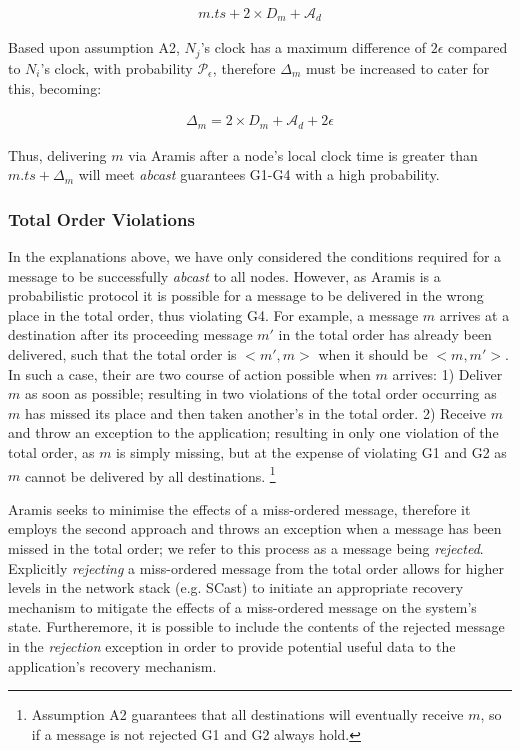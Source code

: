 		\begin{equation*}
		    \begin{aligned}
		        m.ts + 2\times{D_m} + \mathcal{A}_d
		    \end{aligned}
		\end{equation*}
		 
		 Based upon assumption A2, $N_j$'s clock has a maximum difference of $2\epsilon$ compared to $N_i$'s clock, with  probability $\mathcal{P}_\epsilon$, therefore $\Delta_m$ must be increased to cater for this, becoming:
		
        \begin{equation*}
		    \begin{aligned}
		        \Delta_m = 2 \times D_m + \mathcal{A}_d + 2\epsilon
		    \end{aligned}
		\end{equation*}		
		
		Thus, delivering $m$ via \textsf{Aramis} after a node's local clock time is greater than $m.ts + \Delta_m$ will meet \emph{abcast} guarantees G1-G4 with a high probability.
			    
		\subsubsection*{Total Order Violations}\label{ssec:abcast_rejection}
		In the explanations above, we have only considered the conditions required for a message to be successfully \emph{abcast} to all nodes.  However, as \textsf{Aramis} is a probabilistic protocol it is possible for a message to be delivered in the wrong place in the total order, thus violating G4.  For example, a message $m$ arrives at a destination after its proceeding message $m'$ in the total order has already been delivered, such that the total order is $<m', m>$ when it should be $<m, m'>$.  In such a case, their are two course of action possible when $m$ arrives: 1) Deliver $m$ as soon as possible; resulting in two violations of the total order occurring as $m$ has missed its place and then taken another's in the total order.  2) Receive $m$ and throw an exception to the application; resulting in only one violation of the total order, as $m$ is simply missing, but at the expense of violating G1 and G2 as $m$ cannot be delivered by all destinations.  \footnote{Assumption A2 guarantees that all destinations will eventually receive $m$, so if a message is not rejected G1 and G2 always hold.}
		
		\textsf{Aramis} seeks to minimise the effects of a miss-ordered message, therefore it employs the second approach and throws an exception when a message has been missed in the total order; we refer to this process as a message being \emph{rejected}.  Explicitly \emph{rejecting} a miss-ordered message from the total order allows for higher levels in the network stack (e.g. \textsf{SCast}) to initiate an appropriate recovery mechanism to mitigate the effects of a miss-ordered message on the system's state.  Furtheremore, it is possible to include the contents of the rejected message in the \emph{rejection} exception in order to provide potential useful data to the application's recovery mechanism.  
		
